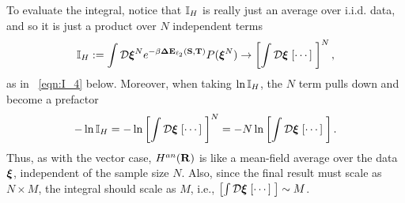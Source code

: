 
To evaluate the integral, notice that $\mathbb{I}_{H}$ is really just an average over i.i.d. data, and so it is just a product over $N$ independent terms
\begin{align}
\mathbb{I}_{H} := \int\mathcal{D}\boldsymbol{\xi}^{N}  e^{-\beta \mathbf{\Delta {E}}_{\ell_2}({\mathbf{S}},{\mathbf{T}})} P(\boldsymbol{\xi}^{N})  \rightarrow\left[\int\mathcal{D}\boldsymbol{\xi} \;[\cdots]\; \right]^{N} ,
\end{align}
as in \EQN~\ref{eqn:I_4} below.
Moreover, when taking $\ln \mathbb{I}_{H}$, the $N$ term pulls down and become a prefactor
\begin{align}
-\ln \mathbb{I}_{H} = -\ln\left[\int\mathcal{D}\boldsymbol{\xi} \;[\cdots]\; \right]^{N}= -N\ln\left[\int\mathcal{D}\boldsymbol{\xi} \;[\cdots]\; \right] .
\end{align}
Thus, as with the vector case, $H^{an}(\mathbf{R})$ is like a mean-field average over the data $\boldsymbol{\xi}$, independent of the sample size $N$.
Also, since the final result must scale as $N\times M$, the integral should scale as $M$, i.e.,
$\left[\int\mathcal{D}\boldsymbol{\xi} \;[\cdots]\; \right]\sim M$.


